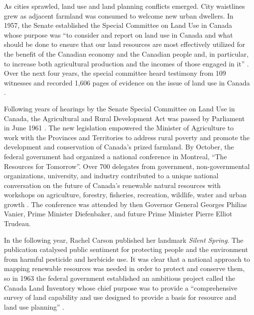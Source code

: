 \documentclass[
]{book}
\begin{document}
As cities sprawled, land use and land planning conflicts emerged. City waistlines grew as adjacent farmland was consumed to welcome new urban dwellers. In 1957, the Senate established the Special Committee on Land Use in Canada whose purpose was ``to consider and report on land use in Canada and what should be done to ensure that our land resources are most effectively utilized for the benefit of the Canadian economy and the Canadian people and, in particular, to increase both agricultural production and the incomes of those engaged in it'' \citep{the_senate_of_canada_minutes_1957}. Over the next four years, the special committee heard testimony from 109 witnesses and recorded 1,606 pages of evidence on the issue of land use in Canada \citep{special_committee_on_land_use_in_canada_consolidation_1963}.

Following years of hearings by the Senate Special Committee on Land Use in Canada, the Agricultural and Rural Development Act was passed by Parliament in June 1961 \citep{mccrorie_arda_1969}. The new legislation empowered the Minister of Agriculture to work with the Provinces and Territories to address rural poverty and promote the development and conservation of Canada's prized farmland. By October, the federal government had organized a national conference in Montreal, ``The Resources for Tomorrow''. Over 700 delegates from government, non-governmental organizations, university, and industry contributed to a unique national conversation on the future of Canada's renewable natural resources with workshops on agriculture, forestry, fisheries, recreation, wildlife, water and urban growth \citep{gray_resources_1962}. The conference was attended by then Governor General Georges Philias Vanier, Prime Minister Diefenbaker, and future Prime Minister Pierre Elliot Trudeau.

In the following year, Rachel Carson published her landmark \emph{Silent Spring}. The publication catalysed public sentiment for protecting people and the environment from harmful pesticide and herbicide use. It was clear that a national approach to mapping renewable resources was needed in order to protect and conserve them, so in 1963 the federal government established an ambitious project called the Canada Land Inventory whose chief purpose was to provide a ``comprehensive survey of land capability and use designed to provide a basis for resource and land use planning'' \citep{department_of_regional_economic_expansion_canada_1965}.
\end{document}
